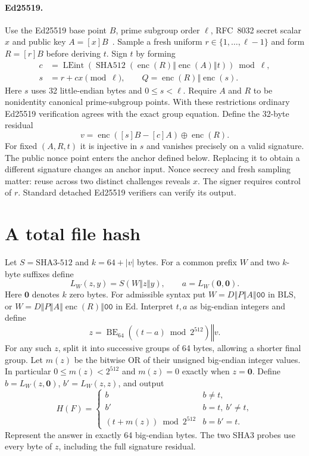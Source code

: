 \documentclass[10pt,twocolumn,letterpaper]{article}
\newcommand{\cat}{\mathbin\Vert}
\newcommand{\enc}{\operatorname{enc}}
\newcommand{\zeros}{\mathbf{0}}
\begin{document}
\paragraph{Ed25519.}
Use the Ed25519 base point $B$, prime subgroup order $\ell$, RFC~8032 secret scalar $x$ and public key $A=[x]B$~\cite{ed}. Sample a fresh uniform $r\in\{1,\ldots,\ell-1\}$ and form $R=[r]B$ before deriving $t$. Sign $t$ by forming
\begin{align*}
 c &= \operatorname{LEint}(\operatorname{SHA512}
       (\enc(R)\cat\enc(A)\cat t))\bmod\ell,\\
 s &= r+cx \pmod\ell,\qquad Q=\enc(R)\cat\enc(s).
\end{align*}
Here $s$ uses 32 little-endian bytes and $0\le s<\ell$. Require $A$ and $R$ to be nonidentity canonical prime-subgroup points. With these restrictions ordinary Ed25519 verification agrees with the exact group equation. Define the 32-byte residual
\[
 v=\enc([s]B-[c]A)\mathbin\oplus\enc(R).
\]
For fixed $(A,R,t)$ it is injective in $s$ and vanishes precisely on a valid signature. The public nonce point enters the anchor defined below. Replacing it to obtain a different signature changes an anchor input. Nonce secrecy and fresh sampling matter: reuse across two distinct challenges reveals $x$. The signer requires control of $r$. Standard detached Ed25519 verifiers can verify its output.

\section{A total file hash}
Let $S=\mathrm{SHA3\text{-}512}$ and $k=64+|v|$ bytes. For a common prefix $W$ and two $k$-byte suffixes define
\[
 L_W(z,y)= S(W\cat z\cat y),\qquad
 a=L_W(\zeros,\zeros).
\]
Here $\zeros$ denotes $k$ zero bytes. For admissible syntax put $W=D\cat P\cat A\cat\mathtt{00}$ in BLS, or $W=D\cat P\cat A\cat\enc(R)\cat\mathtt{00}$ in Ed. Interpret $t,a$ as big-endian integers and define
\[
 z=\operatorname{BE}_{64}((t-a)\bmod 2^{512})\cat v .
\]
For any such $z$, split it into successive groups of 64 bytes, allowing a shorter final group. Let $m(z)$ be the bitwise OR of their unsigned big-endian integer values. In particular $0\le m(z)<2^{512}$ and $m(z)=0$ exactly when $z=\zeros$. Define $b=L_W(z,\zeros)$, $b'=L_W(z,z)$, and output
\[
 H(F)=
 \begin{cases}
 b & b\ne t,\\
 b' & b=t,\ b'\ne t,\\
 (t+m(z))\bmod 2^{512} & b=b'=t.
 \end{cases}
\]
Represent the answer in exactly 64 big-endian bytes. The two SHA3 probes use every byte of $z$, including the full signature residual.
\end{document}
